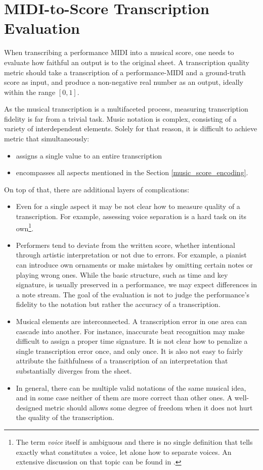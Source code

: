\chapter{MIDI-to-Score Transcription Evaluation}

When transcribing a performance MIDI into a musical score, one needs to evaluate how faithful an output is to the original sheet. A transcription quality metric should take a transcription of a performance-MIDI and a ground-truth score as input, and produce a non-negative real number as an output, ideally within the range $[0, 1]$.

As the musical transcription is a multifaceted process, measuring transcription fidelity is far from a trivial task. Music notation is complex, consisting of a variety of interdependent elements. Solely for that reason, it is difficult to achieve metric that simultaneously: \begin{itemize}
	\item assigns a single value to an entire transcription
	\item encompasses all aspects mentioned in the Section \ref{music_score_encoding}. 
\end{itemize}

On top of that, there are additional layers of complications: \begin{itemize}
	\item Even for a single aspect it may be not clear how to measure quality of a transcription. For example, assessing voice separation is a hard task on its own\footnote{The term \emph{voice} itself is ambiguous and there is no single definition that tells exactly what constitutes a voice, let alone how to separate voices. An extensive discussion on that topic can be found in \cite{Cambouropoulos2008}.}.
	\item Performers tend to deviate from the written score, whether intentional through artistic interpretation or not due to errors. For example, a pianist can introduce own ornaments or make mistakes by omitting certain notes or playing wrong ones. While the basic structure, such as time and key signature, is usually preserved in a performance, we may expect differences in a note stream. The goal of the evaluation is not to judge the performance's fidelity to the notation but rather the accuracy of a transcription.
	\item Musical elements are interconnected. A transcription error in one area can cascade into another. For instance, inaccurate beat recognition may make difficult to assign a proper time signature. It is not clear how to penalize a single transcription error once, and only once. It is also not easy to fairly attribute the faithfulness of a transcription of an interpretation that substantially diverges from the sheet.
	\item In general, there can be multiple valid notations of the same musical idea, and in some case neither of them are more correct than other ones. A well-designed metric should allows some degree of freedom when it does not hurt the quality of the transcription.
\end{itemize}

